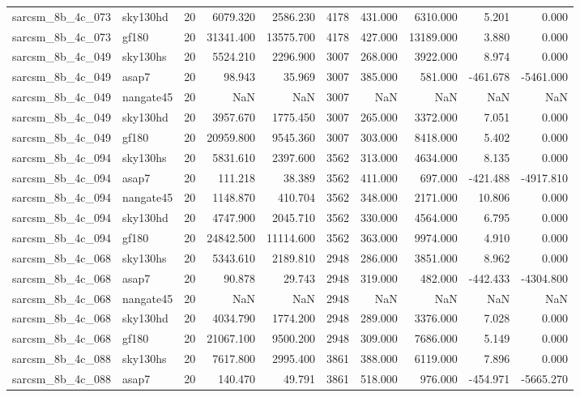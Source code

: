 \begin{tabular}{llrrrrrrrr}
sarcsm\_8b\_4c\_073 & sky130hd & 20 & 6079.320 & 2586.230 & 4178 & 431.000 & 6310.000 & 5.201 & 0.000 \\
sarcsm\_8b\_4c\_073 & gf180 & 20 & 31341.400 & 13575.700 & 4178 & 427.000 & 13189.000 & 3.880 & 0.000 \\
sarcsm\_8b\_4c\_049 & sky130hs & 20 & 5524.210 & 2296.900 & 3007 & 268.000 & 3922.000 & 8.974 & 0.000 \\
sarcsm\_8b\_4c\_049 & asap7 & 20 & 98.943 & 35.969 & 3007 & 385.000 & 581.000 & -461.678 & -5461.000 \\
sarcsm\_8b\_4c\_049 & nangate45 & 20 & NaN & NaN & 3007 & NaN & NaN & NaN & NaN \\
sarcsm\_8b\_4c\_049 & sky130hd & 20 & 3957.670 & 1775.450 & 3007 & 265.000 & 3372.000 & 7.051 & 0.000 \\
sarcsm\_8b\_4c\_049 & gf180 & 20 & 20959.800 & 9545.360 & 3007 & 303.000 & 8418.000 & 5.402 & 0.000 \\
sarcsm\_8b\_4c\_094 & sky130hs & 20 & 5831.610 & 2397.600 & 3562 & 313.000 & 4634.000 & 8.135 & 0.000 \\
sarcsm\_8b\_4c\_094 & asap7 & 20 & 111.218 & 38.389 & 3562 & 411.000 & 697.000 & -421.488 & -4917.810 \\
sarcsm\_8b\_4c\_094 & nangate45 & 20 & 1148.870 & 410.704 & 3562 & 348.000 & 2171.000 & 10.806 & 0.000 \\
sarcsm\_8b\_4c\_094 & sky130hd & 20 & 4747.900 & 2045.710 & 3562 & 330.000 & 4564.000 & 6.795 & 0.000 \\
sarcsm\_8b\_4c\_094 & gf180 & 20 & 24842.500 & 11114.600 & 3562 & 363.000 & 9974.000 & 4.910 & 0.000 \\
sarcsm\_8b\_4c\_068 & sky130hs & 20 & 5343.610 & 2189.810 & 2948 & 286.000 & 3851.000 & 8.962 & 0.000 \\
sarcsm\_8b\_4c\_068 & asap7 & 20 & 90.878 & 29.743 & 2948 & 319.000 & 482.000 & -442.433 & -4304.800 \\
sarcsm\_8b\_4c\_068 & nangate45 & 20 & NaN & NaN & 2948 & NaN & NaN & NaN & NaN \\
sarcsm\_8b\_4c\_068 & sky130hd & 20 & 4034.790 & 1774.200 & 2948 & 289.000 & 3376.000 & 7.028 & 0.000 \\
sarcsm\_8b\_4c\_068 & gf180 & 20 & 21067.100 & 9500.200 & 2948 & 309.000 & 7686.000 & 5.149 & 0.000 \\
sarcsm\_8b\_4c\_088 & sky130hs & 20 & 7617.800 & 2995.400 & 3861 & 388.000 & 6119.000 & 7.896 & 0.000 \\
sarcsm\_8b\_4c\_088 & asap7 & 20 & 140.470 & 49.791 & 3861 & 518.000 & 976.000 & -454.971 & -5665.270 \\

\end{tabular}

